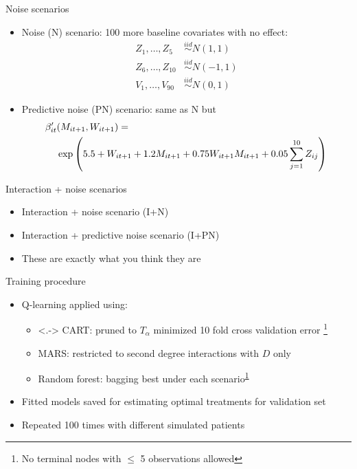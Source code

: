 \documentclass{beamer}
\begin{document}
\begin{frame}[c]{Noise scenarios}
  \begin{itemize}[<+->]
    \item Noise (N) scenario: 100 more baseline covariates with no effect:
  \begin{align*}
    Z_{1}, \ldots, Z_{5} &\overset{iid}{\sim} N(1, 1) \\
    Z_{6}, \ldots, Z_{10} &\overset{iid}{\sim} N(-1, 1) \\
    V_{1}, \ldots, V_{90} &\overset{iid}{\sim} N(0, 1)
  \end{align*}
  \item Predictive noise (PN) scenario: same as N but
  \begin{align*}
    \beta'_{it}&(M_{it+1}, W_{it+1}) = \\
    &\exp\del{5.5 + W_{it+1} + 1.2 M_{it+1} + 0.75 W_{it+1} M_{it+1} + 0.05 \sum_{j = 1}^{10} Z_{ij}}
  \end{align*}
  \end{itemize}
\end{frame}

\begin{frame}[c]{Interaction + noise scenarios}
  
  \begin{itemize}[<+->]
    \item Interaction + noise scenario (I+N)
    \item Interaction + predictive noise scenario (I+PN)
    \item These are exactly what you think they are
  \end{itemize}
\end{frame}


\begin{frame}[c]{Training procedure}
  \begin{itemize}[<+->]
    \item Q-learning applied using:
    \begin{itemize}
      \item<.-> CART: pruned to $T_{\alpha}$ minimized 10 fold cross validation error \footnote{\label{tree} No terminal nodes with $\leq$ 5 observations allowed}
      \item MARS: restricted to second degree interactions with $D$ only
      \item Random forest: bagging best under each scenario\textsuperscript{\ref{tree}}
    \end{itemize}
    \item Fitted models saved for estimating optimal treatments for validation set
    \item Repeated 100 times with different simulated patients
  \end{itemize}
\end{frame}
\end{document}
